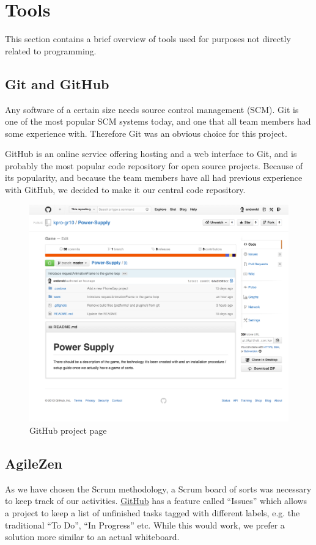 \section{Tools}

    This section contains a brief overview of tools used for purposes not
    directly related to programming.

\subsection{Git and GitHub}
\label{subsec:git}
    Any software of a certain size needs source control management (SCM). Git is
    one of the most popular SCM systems today, and one that all team members had
    some experience with. Therefore Git was an obvious choice for this project.

    GitHub \cite{github} is an online service offering hosting and a web interface to Git, and is
    probably the most popular code repository for open source projects. Because of
    its popularity, and because the team members have all had previous experience
    with GitHub, we decided to make it our central code repository.

\begin{figure}[htb]
  \centering
  \includegraphics[width=1\textwidth]{pictures/github.png}
  \caption{GitHub project page}
\end{figure}

\subsection{AgileZen}
    As we have chosen the Scrum methodology, a Scrum board of sorts was necessary to
    keep track of our activities. \href{https://github.com}{GitHub} has a
    feature called ``Issues'' which allows a project to keep a list of unfinished
    tasks tagged with different labels, e.g. the traditional ``To Do'', ``In
    Progress'' etc. While this would work, we prefer a solution more similar to an
    actual whiteboard. \cite{agileZen}

